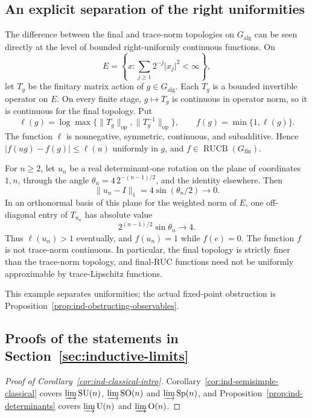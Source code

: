\subsection{An explicit separation of the right uniformities}\label{sec:ind-separation}

The difference between the final and trace-norm topologies on $G_{\mathrm{alg}}$
can be seen directly at
the level of bounded right-uniformly continuous functions. On
\[
E=\left\{x:\sum_{j\ge1}2^{-j}\lvert x_j\rvert^2<\infty\right\},
\]
let $T_g$ be the finitary matrix action of $g\in G_{\mathrm{alg}}$.
Each $T_g$ is a bounded invertible operator on $E$. On every finite
stage, $g\mapsto T_g$ is continuous in operator norm, so it is
continuous for the final topology. Put
\[
\ell(g)=\log\max\{\lVert T_g\rVert_{\mathrm{op}},\lVert T_g^{-1}\rVert_{\mathrm{op}}\},
\qquad f(g)=\min\{1,\ell(g)\}.
\]
The function $\ell$ is nonnegative, symmetric, continuous, and
subadditive. Hence
$\lvert f(ug)-f(g)\rvert\le\ell(u)$ uniformly in $g$, and
$f\in\operatorname{RUCB}(G_{\mathrm{fin}})$.

For $n\ge2$, let $u_n$ be a real determinant-one rotation on the
plane of coordinates $1,n$, through the angle
$\theta_n=4\,2^{-(n-1)/2}$, and the identity elsewhere. Then
\[
\lVert u_n-I\rVert_1=4\sin(\theta_n/2)\longrightarrow0.
\]
In an orthonormal basis of this plane for the weighted norm of $E$,
one off-diagonal entry of $T_{u_n}$ has absolute value
\[
2^{(n-1)/2}\sin\theta_n\longrightarrow4.
\]
Thus $\ell(u_n)>1$ eventually, and $f(u_n)=1$ while $f(e)=0$.
The function $f$ is not trace-norm continuous. In particular, the final
topology is strictly finer than the trace-norm topology, and final-RUC
functions need not be uniformly approximable by trace-Lipschitz
functions.

This example separates uniformities; the actual fixed-point
obstruction is Proposition~\ref{prop:ind-obstructing-observables}.

\subsection{Proofs of the statements in Section~\ref{sec:inductive-limits}}\label{sec:ind-encyclopaedia-proofs}

\begin{proof}[Proof of Corollary~\ref{cor:ind-classical-intro}]
Corollary~\ref{cor:ind-semisimple-classical} covers $\varinjlim\operatorname{SU}(n)$,
$\varinjlim\operatorname{SO}(n)$ and $\varinjlim\operatorname{Sp}(n)$, and
Proposition~\ref{prop:ind-determinants} covers $\varinjlim\operatorname{U}(n)$ and
$\varinjlim\operatorname{O}(n)$.
\end{proof}


